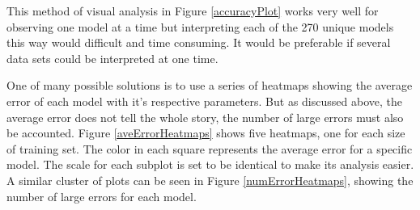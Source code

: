 \par This method of visual analysis in Figure \ref{accuracyPlot} works very well for observing one model at a time but interpreting each of the 270 unique models this way would difficult and time consuming. It would be preferable if several data sets could be interpreted at one time.
\par One of many possible solutions is to use a series of heatmaps showing the average error of each model with it's respective parameters. But as discussed above, the average error does not tell the whole story, the number of large errors must also be accounted. Figure \ref{aveErrorHeatmaps} shows five heatmaps, one for each size of training set. The color in each square represents the average error for a specific model. The scale for each subplot is set to be identical to make its analysis easier. A similar cluster of plots can be seen in Figure \ref{numErrorHeatmaps}, showing the number of large errors for each model. 


